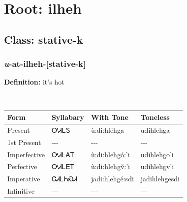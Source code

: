 \needspace{4in}
\section*{Root: ilheh}
\nopagebreak
{}
\needspace{3in}
\subsection*{Class: stative-k}
\nopagebreak
\needspace{2in}
\subsubsection*{\textit{u}{-}at{-}\textbf{ilheh}{-}[stative-k]}
\nopagebreak
\textbf{Definition: } it{\textquoteright}s hot
\\[0.5em]
\begin{tabularx}{\textwidth}{l X X X}%
\toprule%
\textbf{Form}&\textbf{Syllabary}&\textbf{With Tone}&\textbf{Toneless}\\%
\midrule%
Present&ᎤᏗᏞᎦ&ù:di:hléhga&udihlehga\\%
1st Present&{-}{-}{-}&{-}{-}{-}&{-}{-}{-}\\%
Imperfective&ᎤᏗᏞᎪᎢ&ù:di:hlehgó:’i&udihlehgo’i\\%
Perfective&ᎤᏗᏞᎬᎢ&ù:di:hlehgv̌:’i&udihlehgv’i\\%
Imperative&ᏣᏗᏞᎨᏍᏗ&jadi:hlehgé:sdi&jadihlehgesdi\\%
Infinitive&{-}{-}{-}&{-}{-}{-}&{-}{-}{-}\\%
\bottomrule%
\end{tabularx}
\\[1em]